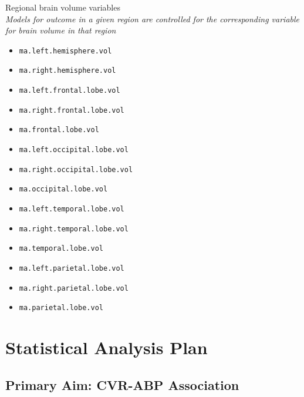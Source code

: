 \documentclass[10pt]{article}\usepackage[]{graphicx}\usepackage[]{color}
\begin{document}
Regional brain volume variables\\
{\it Models for outcome in a given region are controlled for the corresponding variable for brain volume in that region}
\begin{itemize}
  \item \texttt{ma.left.hemisphere.vol}
  \item \texttt{ma.right.hemisphere.vol}
  \item \texttt{ma.left.frontal.lobe.vol}
  \item \texttt{ma.right.frontal.lobe.vol}
  \item \texttt{ma.frontal.lobe.vol}
  \item \texttt{ma.left.occipital.lobe.vol}
  \item \texttt{ma.right.occipital.lobe.vol}
  \item \texttt{ma.occipital.lobe.vol}
  \item \texttt{ma.left.temporal.lobe.vol}
  \item \texttt{ma.right.temporal.lobe.vol}
  \item \texttt{ma.temporal.lobe.vol}
  \item \texttt{ma.left.parietal.lobe.vol}
  \item \texttt{ma.right.parietal.lobe.vol}
  \item \texttt{ma.parietal.lobe.vol}
\end{itemize}

\clearpage

\section{Statistical Analysis Plan}

\subsection{Primary Aim: CVR-ABP Association}
\end{document}
